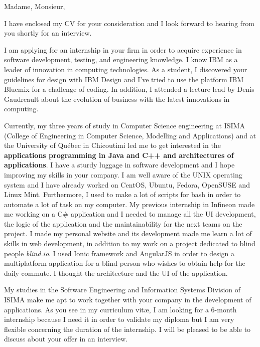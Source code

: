 \date{\today}
\opening{Madame, Monsieur,}
\closing{I have enclosed my CV for your consideration and I look forward to hearing from you shortly for an interview.}

\makelettertitle

I am applying for an internship in your firm in order to acquire experience in software development, testing, and engineering knowledge. I know IBM as a leader of innovation in computing technologies. As a student, I discovered your guidelines for design with IBM Design and I've tried to use the platform IBM Bluemix for a challenge of coding. In addition, I attended a lecture lead by Denis Gaudreault about the evolution of business with the latest innovations in computing.

Currently, my three years of study in Computer Science engineering at ISIMA (College of Engineering in Computer Science, Modelling and Applications) and at the University of Québec in Chicoutimi led me to get interested in the \textbf{applications programming in Java and C++ and architectures of applications}. I have a sturdy luggage in software development and I hope improving my skills in your company. I am well aware of the UNIX operating system and I have already worked on CentOS, Ubuntu, Fedora, OpenSUSE and Linux Mint. Furthermore, I used to make a lot of scripts for bash in order to automate a lot of task on my computer. My previous internship in Infineon made me working on a C\# application and I needed to manage all the UI development, the logic of the application and the maintainability for the next teams on the project. I made my personal website and its development made me learn a lot of skills in web development, in addition to my work on a project dedicated to blind people \textit{blind.io}. I used Ionic framework and AngularJS in order to design a multiplatform application for a blind person who wishes to obtain help for the daily commute. I thought the architecture and the UI of the application.  

My studies in the Software Engineering and Information Systems Division of ISIMA make me apt to work together with your company in the development of applications. As you see in my curriculum vit\ae{}, I am looking for a 6-month internship because I need it in order to validate my diploma but I am very flexible concerning the duration of the internship. I will be pleased to be able to discuss about your offer in an interview.

\makeletterclosing
